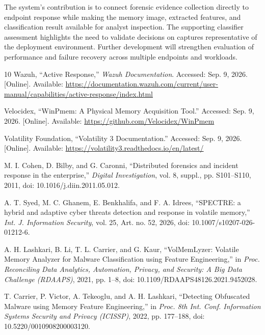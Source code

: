 \documentclass[conference]{IEEEtran}
\begin{document}
The system's contribution is to connect forensic evidence collection directly to endpoint response while making the memory image, extracted features, and classification result available for analyst inspection. The supporting
classifier assessment highlights the need to validate decisions on captures representative of the deployment environment. Further development will strengthen evaluation of performance and failure recovery across multiple endpoints and workloads.
\newpage
\begin{thebibliography}{10}
 Wazuh, ``Active Response,'' \textit{Wazuh Documentation}.
Accessed: Sep. 9, 2026. [Online]. Available:
\url{https://documentation.wazuh.com/current/user-manual/capabilities/active-response/index.html}

 Velocidex, ``WinPmem: A Physical Memory Acquisition Tool.''
Accessed: Sep. 9, 2026. [Online]. Available:
\url{https://github.com/Velocidex/WinPmem}

 Volatility Foundation, ``Volatility 3 Documentation.''
Accessed: Sep. 9, 2026. [Online]. Available:
\url{https://volatility3.readthedocs.io/en/latest/}

 M. I. Cohen, D. Bilby, and G. Caronni,
``Distributed forensics and incident response in the enterprise,''
\textit{Digital Investigation}, vol. 8, suppl., pp. S101--S110, 2011,
doi: 10.1016/j.diin.2011.05.012.

 A. T. Syed, M. C. Ghanem, E. Benkhalifa, and
F. A. Idrees, ``SPECTRE: a hybrid and adaptive cyber threats detection and
response in volatile memory,'' \textit{Int. J. Information Security},
vol. 25, Art. no. 52, 2026, doi: 10.1007/s10207-026-01212-6.

 A. H. Lashkari, B. Li, T. L. Carrier, and G. Kaur,
``VolMemLyzer: Volatile Memory Analyzer for Malware Classification using
Feature Engineering,'' in \textit{Proc. Reconciling Data Analytics,
Automation, Privacy, and Security: A Big Data Challenge (RDAAPS)},
2021, pp. 1--8, doi: 10.1109/RDAAPS48126.2021.9452028.

 T. Carrier, P. Victor, A. Tekeoglu, and A. H. Lashkari,
``Detecting Obfuscated Malware using Memory Feature Engineering,'' in
\textit{Proc. 8th Int. Conf. Information Systems Security and Privacy
(ICISSP)}, 2022, pp. 177--188, doi: 10.5220/0010908200003120.


\end{thebibliography}
\end{document}
